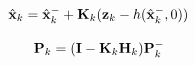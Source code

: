 \begin{equation}
\label{equ:Rozszerzony_Filtr_Kalmana_faza_korekcji_stan}
	\hat{\vec{x}}_k = \hat{\vec{x}}_k^- + \matr{K}_k(\vec{z}_k - h(\hat{\vec{x}}_k^-,0))
\end{equation}

\begin{equation}
\label{equ:Rozszerzony_Filtr_Kalmana_faza_korekcji_macierz_kowariancji_bledow}
	\mathbf{P}_k = (\mathbf{I} - \mathbf{K}_k \mathbf{H}_k) \mathbf{P}_k^-
\end{equation}